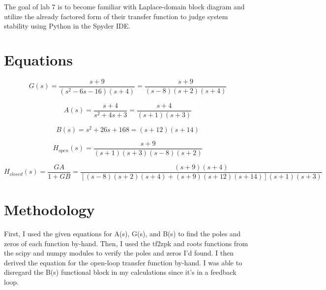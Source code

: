 \documentclass[12pt]{report}
\begin{document}
The goal of lab 7 is to become familiar with Laplace-domain block diagram and utilize the already factored form of their transfer function to judge system stability using Python in the Spyder IDE.

\section{Equations}
    \begin{equation}
        G(s) = \frac{s+9}{(s^2-6s-16)(s+4)} = \frac{s+9}{(s-8)(s+2)(s+4)}
    \end{equation}
    
    \begin{equation}
        A(s) = \frac{s+4}{s^2+4s+3} = \frac{s+4}{(s+1)(s+3)}
    \end{equation}
 
     \begin{equation}
        B(s) = s^2+26s+168 = (s+12)(s+14)
    \end{equation}
    
    \begin{equation}
        H_{open}(s) = \frac{s+9}{(s+1)(s+3)(s-8)(s+2)}
    \end{equation}
    
    \begin{equation}
        H_{closed}(s) = \frac{GA}{1+GB} = \frac{(s+9)(s+4)}{[(s-8)(s+2)(s+4) + (s+9)(s+12)(s+14)](s+1)(s+3)} 
    \end{equation}
    
\section{Methodology}


    \paragraph{} First, I used the given equations for A(s), G(s), and B(s) to find the poles and zeros of each function by-hand. Then, I used the tf2zpk and roots functions from the scipy and numpy modules to verify the poles and zeros I'd found. I then derived the equation for the open-loop transfer function by-hand. I was able to disregard the B(s) functional block in my calculations since it's in a feedback loop. 
    
\end{document}
